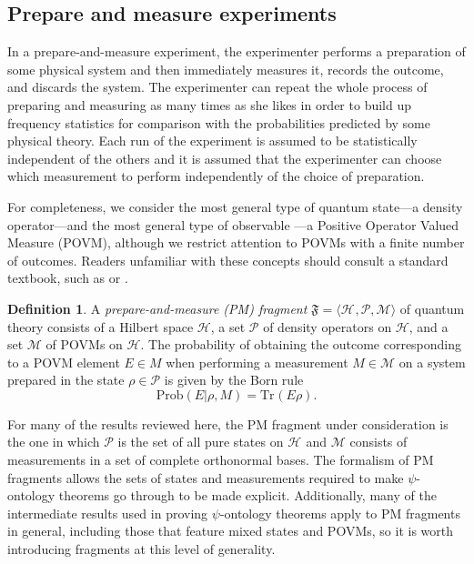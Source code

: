 \documentclass[DIV=calc,fontsize=12pt]{scrartcl} %
\theoremstyle{definition}
\newtheorem{definition}{Definition}[section]
\theoremstyle{plain}
\newcommand{\Hilb}[1][]{\ensuremath{\mathcal{H}_{#1}}}
\newcommand{\Tr}[2][]{\ensuremath{\text{Tr}_{#1} \left ( #2 \right )}}
\begin{document}
\subsection{Prepare and measure experiments}

\label{PME}

In a prepare-and-measure experiment, the experimenter performs a
preparation of some physical system and then immediately measures it,
records the outcome, and discards the system.  The experimenter can
repeat the whole process of preparing and measuring as many times as
she likes in order to build up frequency statistics for comparison
with the probabilities predicted by some physical theory.  Each run of
the experiment is assumed to be statistically independent of the
others and it is assumed that the experimenter can choose which
measurement to perform independently of the choice of preparation.

For completeness, we consider the most general type of quantum
state---a density operator---and the most general type of observable
---a Positive Operator Valued Measure (POVM), although we restrict
attention to POVMs with a finite number of outcomes.  Readers
unfamiliar with these concepts should consult a standard textbook,
such as \cite{Nielsen2000} or \cite{Heinosaari2011}.

\begin{definition}
\label{def:Form:PM}
A \emph{prepare-and-measure (PM) fragment} $\mathfrak{F} = \langle
\Hilb, \mathcal{P}, \mathcal{M} \rangle$ of quantum theory consists
of a Hilbert space $\mathcal{H}$, a set $\mathcal{P}$ of density
operators on $\mathcal{H}$, and a set $\mathcal{M}$ of POVMs on
$\mathcal{H}$.  The probability of obtaining the outcome
corresponding to a POVM element $E \in M$ when performing a
measurement $M \in \mathcal{M}$ on a system prepared in the state
$\rho \in \mathcal{P}$ is given by the Born rule
\begin{equation}
\label{eq:Form:qprob}
\text{Prob}(E|\rho, M) = \Tr{E \rho}.
\end{equation}
\end{definition}

For many of the results reviewed here, the PM fragment under
consideration is the one in which $\mathcal{P}$ is the set of all pure
states on $\Hilb$ and $\mathcal{M}$ consists of measurements in a set
of complete orthonormal bases.  The formalism of PM fragments allows
the sets of states and measurements required to make $\psi$-ontology
theorems go through to be made explicit.  Additionally, many of the
intermediate results used in proving $\psi$-ontology theorems apply to
PM fragments in general, including those that feature mixed states and
POVMs, so it is worth introducing fragments at this level of
generality.
\end{document}

